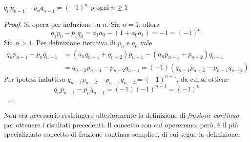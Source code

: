 \begin{lem}\label{lem:Cont_frac_coprimality}
 $q_np_{n-1} - p_nq_{n-1} = (-1)^n$ p ogni $n \geq 1$
\end{lem}
\begin{proof}
 Si opera per induzione su $n$.
 Sia $n=1$, allora 
 \begin{equation}
  q_1p_0 - p_1q_0 = a_1a_0 - (1 + a_0a_1) = -1 = (-1)^n.
 \end{equation}
 Sia $n > 1$. Per definizione iterativa di $p_n$ e $q_n$ vale
 \begin{align}
  q_np_{n-1} - p_nq_{n-1} &= (a_nq_{n-1} + q_{n-2})p_{n-1} - (a_np_{n-1} + p_{n-2})q_{n-1}\\
  &=  q_{n-2}p_{n-1} - p_{n-2}q_{n-1} = (-1)(q_{n-1}p_{n-2} - p_{n-1}q_{n-2})
 \end{align}
 Per ipotesi induttiva $q_{n-1}p_{n-2} - p_{n-1}q_{n-2} = (-1)^{n-1}$, da cui si ottiene
 \begin{equation}
  q_np_{n-1} - p_nq_{n-1} = (-1)(-1)^{n-1} = (-1)^n
 \end{equation}
\end{proof}

Non era necessario restringere ulteriormente la definizione di \textit{frazione continua} per ottenere i risultati precedenti.
Il concetto con cui opereremo, però, è il più specializzato concetto di frazione continua semplice, di cui segue la definizione.

